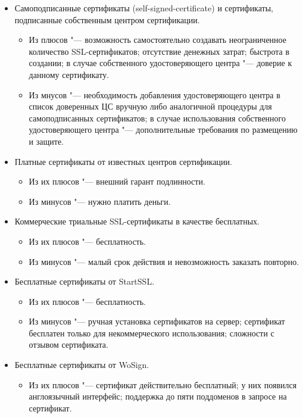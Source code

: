 \documentclass[10pt, a5paper]{article}
\begin{document}
\begin{itemize}
  \item Самоподписанные сертификаты (self-signed-certificate) и сертификаты, подписанные собственным центром сертификации.
\begin{itemize}
  \item Из плюсов "--- возможность самостоятельно создавать \linebreak неограниченное количество SSL-сертификатов; отсутствие денежных затрат; быстрота в создании; в случае собственного удостоверяющего центра "--- доверие к данному сертификату.
  \item Из мнусов "--- необходимость добавления удостоверяющего центра в список доверенных ЦС вручную либо аналогичной процедуры для самоподписанных сертификатов; в случае использования собственного удостоверяющего центра "--- дополнительные требования по размещению и защите.
\end{itemize}


  \item Платные сертификаты от известных центров сертификации.
\begin{itemize}
  \item Из их плюсов "--- внешний гарант подлинности.
  \item Из минусов "--- нужно платить деньги.
\end{itemize}

  \item Коммерческие триальные SSL-сертификаты в качестве бесплатных.
\begin{itemize}
  \item Из их плюсов "--- бесплатность.
  \item Из минусов "--- малый срок действия и невозможность заказать повторно.
\end{itemize}

  \item Бесплатные сертификаты от StartSSL.
\begin{itemize}
  \item Из их плюсов "--- бесплатность.
  \item Из минусов "--- ручная установка сертификатов на сервер; сертификат бесплатен только для некоммерческого использования; сложности с отзывом сертификата.
\end{itemize}


  \item Бесплатные сертификаты от WoSign.
\begin{itemize}
  \item Из их плюсов "--- сертификат действительно бесплатный; у них появился англоязычный интерфейс; поддержка до пяти поддоменов в запросе на сертификат.


\end{itemize}
\end{itemize}
\end{document}

